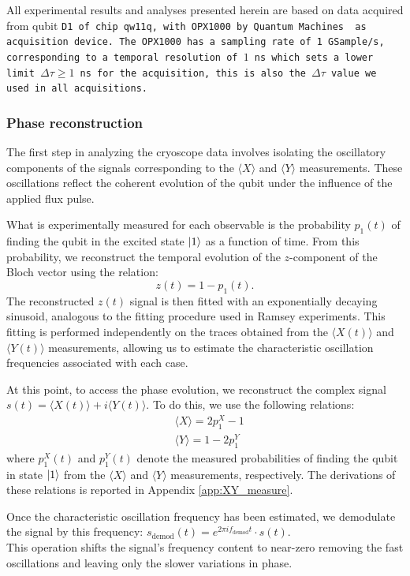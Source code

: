 All experimental results and analyses presented herein are based on data acquired from qubit \tt{D1} of chip \tt{qw11q}, with OPX1000 by Quantum Machines \cite{opx1000} as acquisition device.
The OPX1000 has a sampling rate of 1 GSample/s, corresponding to a temporal resolution of $1$ ns which sets a lower limit $\Delta\tau \geq 1$ ns for the acquisition, this is also the $\Delta\tau$ value we used in all acquisitions.

\subsubsection{Phase reconstruction}
The first step in analyzing the cryoscope data involves isolating the oscillatory components of the signals corresponding to the $\langle X \rangle$ and $\langle Y \rangle$ measurements. 
These oscillations reflect the coherent evolution of the qubit under the influence of the applied flux pulse.

What is experimentally measured for each observable is the probability $p_1(t)$ of finding the qubit in the excited state $\ket{1}$ as a function of time. 
From this probability, we reconstruct the temporal evolution of the $z$-component of the Bloch vector using the relation:
\begin{equation}
z(t) = 1 - p_1(t).
\end{equation}
The reconstructed $z(t)$ signal is then fitted with an exponentially decaying sinusoid, analogous to the fitting procedure used in Ramsey experiments.
This fitting is performed independently on the traces obtained from the $\langle X(t) \rangle$ and $\langle Y(t) \rangle$ measurements, allowing us to estimate the characteristic oscillation frequencies associated with each case.

At this point, to access the phase evolution, we reconstruct the complex signal $s(t) = \langle X(t) \rangle + i\langle Y(t) \rangle$. 
To do this, we use the following relations:
\begin{align}
    & \langle X \rangle = 2p^X_1 - 1 \\
    & \langle Y \rangle = 1 - 2p^Y_1
\end{align}
where $p^X_1(t)$ and $p^Y_1(t)$ denote the measured probabilities of finding the qubit in state $\ket{1}$ from the $\langle X \rangle$ and $\langle Y \rangle$ measurements, respectively.
The derivations of these relations is reported in Appendix \ref{app:XY_measure}.

Once the characteristic oscillation frequency has been estimated, we demodulate the signal by this frequency: $s_{\text{demod}}(t) = e^{2\pi i f_{\text{demod}} t} \cdot s(t)$.\\
This operation shifts the signal's frequency content to near-zero removing the fast oscillations and leaving only the slower variations in phase.

